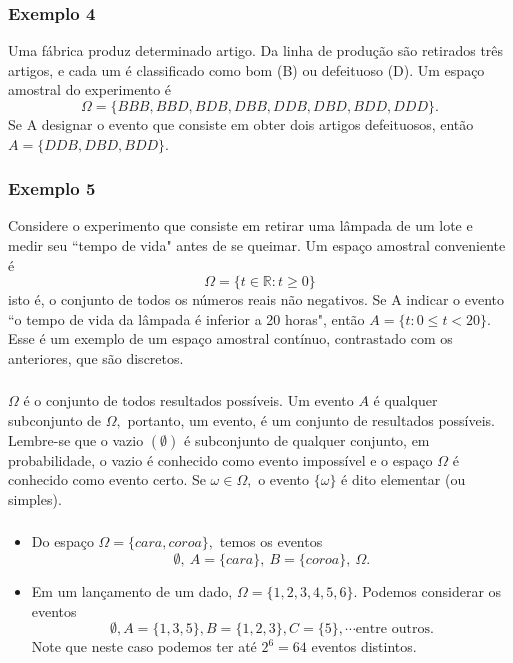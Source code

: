 \documentclass[14pt,aspectratio=1610]{beamer}
\begin{document}
\begin{frame}{}
\frametitle{Exemplo 4}
\small
\begin{block}{}
\justifying
Uma fábrica produz determinado artigo. Da linha de produção são retirados
três artigos, e cada um é classificado como bom (B) ou defeituoso (D). Um
espaço amostral do experimento é
$$\Omega = \{BBB, BBD, BDB, DBB, DDB, DBD, BDD, DDD\}.$$
Se A designar o evento que consiste em obter dois artigos defeituosos, então
$A = \{DDB, DBD, BDD\}.$
\end{block}
\end{frame}

\begin{frame}{}
\frametitle{Exemplo 5}
\small
\begin{block}{}
\justifying
Considere o experimento que consiste em retirar uma lâmpada de um lote e medir seu ``tempo de vida" antes de se queimar. Um espaço amostral conveniente é
$$\Omega=\{t\in \mathds{R}:t\geq 0\}$$
isto é, o conjunto de todos os números reais não negativos. Se A indicar o evento ``o
tempo de vida da lâmpada é inferior a 20 horas", então $A = \{t : 0\leq t<20\}.$ Esse é um exemplo de um espaço amostral contínuo, contrastado com os anteriores, que
são discretos.
\end{block}
\end{frame}

\begin{frame}{}
\frametitle{}
\begin{block}{}
\justifying
$\Omega$ é o conjunto de todos resultados possíveis. Um evento $A$ é qualquer subconjunto de $\Omega,$ portanto, um evento, é um conjunto de resultados possíveis. Lembre-se que o vazio $(\emptyset)$ é subconjunto de qualquer conjunto, em probabilidade, o vazio é conhecido como evento impossível e o espaço $\Omega$ é conhecido como evento certo. Se $\omega \in \Omega,$ o evento $\{\omega\}$ é dito elementar (ou simples).
\end{block}
\end{frame}

\begin{frame}{}
\frametitle{}
\begin{block}{}
\justifying
\begin{itemize}
\item \justifying Do espaço $\Omega=\{cara, coroa\},$ temos os eventos $$\emptyset,\ A=\{cara\},\ B=\{coroa\},\ \Omega.$$ \pause
\item \justifying Em um lançamento de um dado, $\Omega=\{1,2,3,4,5,6\}.$ Podemos considerar os eventos $$\emptyset, A=\{1,3,5\}, B=\{1,2,3\}, C=\{5\},\cdots \text{entre outros}.$$ Note que neste caso podemos ter até $2^{6}=64$ eventos distintos.
\end{itemize}
\end{block}
\end{frame}
\end{document}

